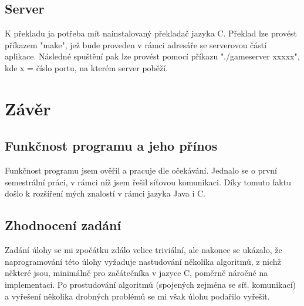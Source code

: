 \documentclass[12pt, a4paper, pdftex, czech, titlepage]{report}
\begin{document}
\section{Server}
K překladu ja potřeba mít nainstalovaný překladač jazyka C. Překlad lze provést příkazem "make", jež bude proveden v rámci adresáře se serverovou částí aplikace.
Následné spuštění pak lze provést pomocí příkazu "./gameserver xxxxx", kde x = číslo portu, na kterém server poběží.

\chapter{Závěr}
\section{Funkčnost programu a jeho přínos}
Funkčnost programu jsem ověřil a pracuje dle očekávání. Jednalo se o první semestrální práci, v rámci níž jsem řešil síťovou komunikaci. Díky tomuto faktu
došlo k rozšíření mých znalostí v rámci jazyka Java i C.

\section{Zhodnocení zadání}
Zadání úlohy se mi zpočátku zdálo velice triviální, ale nakonec se ukázalo, že naprogramování této úlohy vyžaduje nastudování několika algoritmů, z nichž některé jsou,
minimálně pro začátečníka v jazyce C, poměrně náročné na implementaci.
Po prostudování algoritmů (spojených zejména se síť. komunikací) a vyřešení několika drobných problémů se mi však úlohu podařilo vyřešit.
\end{document}
